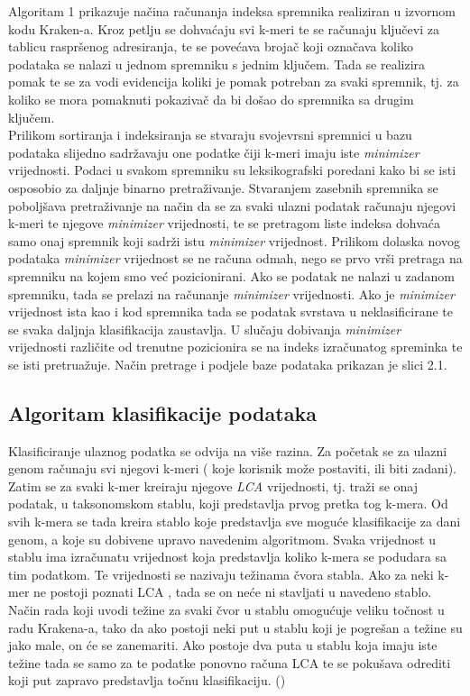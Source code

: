 \documentclass[times, utf8, zavrsni]{fer}
\begin{document}
Algoritam 1 prikazuje načina računanja indeksa spremnika realiziran u izvornom kodu Kraken-a. Kroz petlju se dohvaćaju svi k-meri te se računaju ključevi za tablicu raspršenog adresiranja, te se povećava brojač koji označava koliko podataka se nalazi u jednom spremniku s jednim ključem. Tada se realizira pomak te se za vodi evidencija koliki je pomak potreban za svaki spremnik, tj. za koliko se mora pomaknuti pokazivač da bi došao do spremnika sa drugim ključem.
\\Prilikom sortiranja i indeksiranja se stvaraju svojevrsni spremnici u bazu podataka slijedno sadržavaju one podatke čiji k-meri imaju iste \textit{minimizer} vrijednosti. Podaci u svakom spremniku su leksikografski poredani kako bi se isti osposobio za daljnje binarno pretraživanje. Stvaranjem zasebnih spremnika se poboljšava pretraživanje na način da se za svaki ulazni podatak računaju njegovi k-meri te njegove \textit{minimizer} vrijednosti, te se pretragom liste indeksa dohvaća samo onaj spremnik koji sadrži istu \textit{minimizer} vrijednost. Prilikom dolaska novog podataka \textit{minimizer} vrijednost se ne računa odmah, nego se prvo vrši pretraga na spremniku na kojem smo već pozicionirani. Ako se podatak ne nalazi u zadanom spremniku, tada se prelazi na računanje \textit{minimizer} vrijednosti. Ako je \textit{minimizer} vrijednost ista kao i kod spremnika tada se podatak svrstava u neklasificirane te se svaka daljnja klasifikacija zaustavlja. U slučaju dobivanja \textit{minimizer} vrijednosti različite od trenutne pozicionira se na indeks izračunatog spreminka te se isti pretruažuje. Način pretrage i podjele baze podataka prikazan je slici 2.1.



\subsection{Algoritam klasifikacije podataka}

Klasificiranje ulaznog podatka se odvija na više razina. Za početak se za ulazni genom računaju svi njegovi k-meri ( koje korisnik može postaviti, ili biti zadani). Zatim se za svaki k-mer kreiraju njegove \textit{LCA} vrijednosti, tj. traži se onaj podatak, u taksonomskom stablu, koji predstavlja prvog pretka tog k-mera. Od svih k-mera se tada kreira stablo koje predstavlja sve moguće klasifikacije za dani genom, a koje su dobivene upravo navedenim algoritmom. Svaka vrijednost u stablu ima izračunatu vrijednost koja predstavlja koliko k-mera se podudara sa tim podatkom. Te vrijednosti se nazivaju težinama čvora stabla. Ako za neki k-mer ne postoji poznati LCA , tada se on neće ni stavljati u navedeno stablo. Način rada koji uvodi težine za svaki čvor u stablu omogućuje veliku točnost u radu Krakena-a, tako da ako postoji neki put u stablu koji je pogrešan a težine su jako male, on će se zanemariti. Ako postoje dva puta u stablu koja imaju iste težine tada se samo za te podatke ponovno računa LCA te se pokušava odrediti koji put zapravo predstavlja točnu klasifikaciju. (\cite{Kraken})
\end{document}
